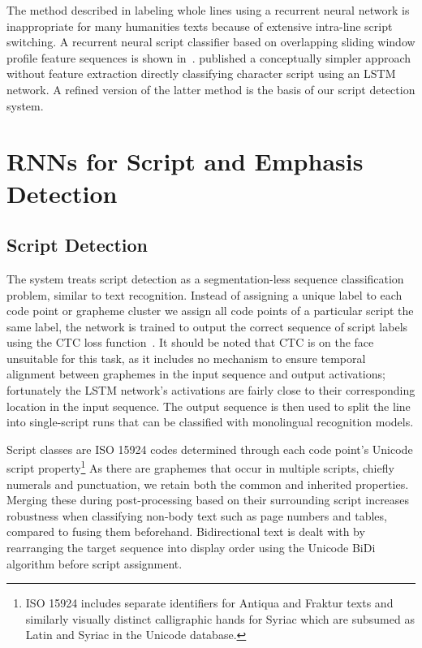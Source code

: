 The method described in \cite{fujii2017sequence} labeling whole lines using a
recurrent neural network is inappropriate for many humanities texts because of
extensive intra-line script switching. A recurrent neural script classifier
based on overlapping sliding window profile feature sequences is shown
in~\cite{singh2015can}. \cite{ul2015sequence} published a conceptually
simpler approach without feature extraction directly classifying character
script using an LSTM network. A refined version of the latter method is the
basis of our script detection system.

\section{RNNs for Script and Emphasis Detection}

\subsection{Script Detection}

The system treats script detection as a segmentation-less sequence
classification problem, similar to text recognition. Instead of assigning a
unique label to each code point or grapheme cluster we assign all code points
of a particular script the same label, the network is trained to output the
correct sequence of script labels using the CTC loss
function~\cite{graves2006connectionist}. It should be noted that CTC is on the
face unsuitable for this task, as it includes no mechanism to ensure temporal
alignment between graphemes in the input sequence and output activations;
fortunately the LSTM network's activations are fairly close to their
corresponding location in the input sequence. The output sequence is then used
to split the line into single-script runs that can be classified with
monolingual recognition models.

Script classes are ISO 15924 codes determined through each code point's Unicode
script property\footnote{ISO 15924 includes separate identifiers for Antiqua
and Fraktur texts and similarly visually distinct calligraphic hands for Syriac
which are subsumed as Latin and Syriac in the Unicode database.} As there are
graphemes that occur in multiple scripts, chiefly numerals and punctuation, we
retain both the common and inherited properties. Merging these during
post-processing based on their surrounding script increases robustness when
classifying non-body text such as page numbers and tables, compared to fusing
them beforehand. Bidirectional text is dealt with by rearranging the target
sequence into display order using the Unicode BiDi algorithm before script
assignment.

